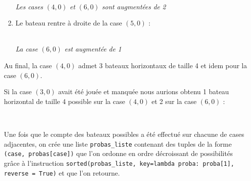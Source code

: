 \begin{enumerate}
\begin{center}
\\
\textit{Les cases $(4,0)$ et $(6,0)$ sont augmentées de 2
}\end{center}

\item Le bateau rentre à droite de la case $(5,0)$ :

\begin{center}
\\
\textit{La case $(6,0)$ est augmentée de 1
}\end{center}
\end{enumerate} 
Au final, la case $(4,0)$ admet 3 bateaux horizontaux de taille 4 et idem pour la case $(6,0)$.

Si la case $(3,0)$ avait été jouée et manquée nous aurions obtenu 1 bateau horizontal de taille 4 possible sur la case $(4,0)$ et 2 sur la case $(6,0)$ :

\begin{center}
\\
\end{center}

Une fois que le compte des bateaux possibles a été effectué sur chacune de cases adjacentes, on crée une liste \texttt{probas\_liste} contenant des tuples de la forme \texttt{(case, probas[case])} que l'on ordonne en ordre décroissant de possibilités grâce à l'instruction \texttt{sorted(probas\_liste, key=lambda proba: proba[1], reverse = True)} et que l'on retourne.

